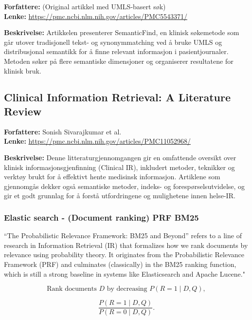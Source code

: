 \textbf{Forfattere:} (Original artikkel med UMLS-basert søk) \\
\textbf{Lenke:} \url{https://pmc.ncbi.nlm.nih.gov/articles/PMC5543371/}

\textbf{Beskrivelse:}  
Artikkelen presenterer SemanticFind, en klinisk søkemetode som går utover tradisjonell tekst- og synonymmatching ved å bruke UMLS og distribusjonal semantikk for å finne relevant informasjon i pasientjournaler. Metoden søker på flere semantiske dimensjoner og organiserer resultatene for klinisk bruk.

\subsection*{Clinical Information Retrieval: A Literature Review}

\textbf{Forfattere:} Sonish Sivarajkumar et al. \\
\textbf{Lenke:} \url{https://pmc.ncbi.nlm.nih.gov/articles/PMC11052968/}

\textbf{Beskrivelse:}  
Denne litteraturgjennomgangen gir en omfattende oversikt over klinisk informasjonsgjenfinning (Clinical IR), inkludert metoder, teknikker og verktøy brukt for å effektivt hente medisinsk informasjon. Artiklene som gjennomgås dekker også semantiske metoder, indeks- og forespørselsutvidelse, og gir et godt grunnlag for å forstå utfordringene og mulighetene innen helse-IR.


\subsubsection{Elastic search - (Document ranking) PRF BM25 }
\label{sec:bm25}
“The Probabilistic Relevance Framework: BM25 and Beyond” refers to a line of research in Information Retrieval (IR) that formalizes how we rank documents by relevance using probability theory. It originates from the Probabilistic Relevance Framework (PRF) and culminates (classically) in the BM25 ranking function, which is still a strong baseline in systems like Elasticsearch and Apache Lucene."

\begin{equation}
\text{Rank documents } D \text{ by decreasing } P(R=1 \mid D, Q),
\end{equation}

\begin{equation}
\frac{P(R=1 \mid D,Q)}{P(R=0 \mid D,Q)}.
\end{equation}

